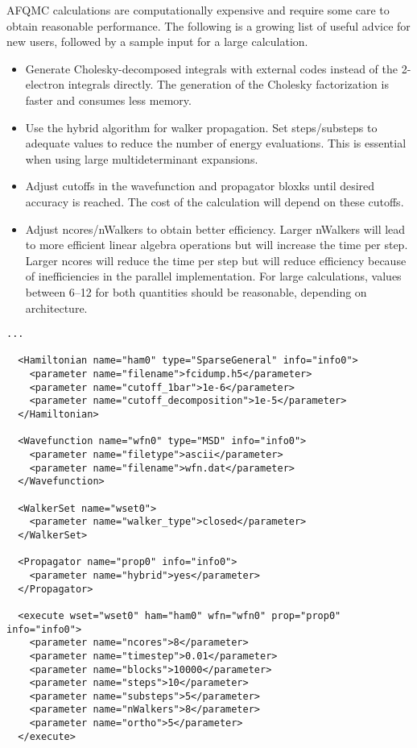 AFQMC calculations are computationally expensive and require some care to obtain reasonable performance.
The following is a growing list of useful advice for new users, followed by a sample input for a large calculation.
\begin{itemize}
\item Generate Cholesky-decomposed integrals with external codes instead of the 2-electron integrals directly. The generation of the Cholesky factorization is faster and consumes less memory. 
\item Use the hybrid algorithm for walker propagation. Set steps/substeps to adequate values to reduce the number of energy evaluations. This is essential when using large multideterminant expansions.
\item Adjust cutoffs in the wavefunction and propagator bloxks until desired accuracy is reached. The cost of the calculation will depend on these cutoffs.
\item Adjust ncores/nWalkers to obtain better efficiency. Larger nWalkers will lead to more efficient linear algebra operations but will increase the time per step. Larger ncores will reduce the time per step but will reduce efficiency because of inefficiencies in the parallel implementation. For large calculations, values between 6--12 for both quantities should be reasonable, depending on architecture. 
\end{itemize}

\begin{lstlisting}[style=QMCPXML,caption=Example of sections of an AFQMC input file for a large calculation.]
...

  <Hamiltonian name="ham0" type="SparseGeneral" info="info0">
    <parameter name="filename">fcidump.h5</parameter>
    <parameter name="cutoff_1bar">1e-6</parameter>
    <parameter name="cutoff_decomposition">1e-5</parameter>
  </Hamiltonian>

  <Wavefunction name="wfn0" type="MSD" info="info0">
    <parameter name="filetype">ascii</parameter>
    <parameter name="filename">wfn.dat</parameter>
  </Wavefunction>

  <WalkerSet name="wset0">
    <parameter name="walker_type">closed</parameter>
  </WalkerSet>

  <Propagator name="prop0" info="info0">
    <parameter name="hybrid">yes</parameter>
  </Propagator>

  <execute wset="wset0" ham="ham0" wfn="wfn0" prop="prop0" info="info0">
    <parameter name="ncores">8</parameter>
    <parameter name="timestep">0.01</parameter>
    <parameter name="blocks">10000</parameter>
    <parameter name="steps">10</parameter>
    <parameter name="substeps">5</parameter>
    <parameter name="nWalkers">8</parameter>
    <parameter name="ortho">5</parameter>
  </execute>
\end{lstlisting}
